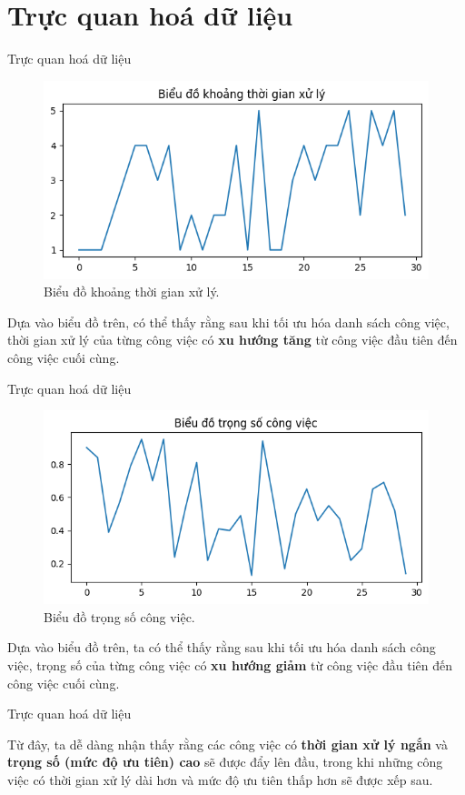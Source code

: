 \documentclass[10pt]{beamer}
\begin{document}
\section*{Trực quan hoá dữ liệu}

\begin{frame}{Trực quan hoá dữ liệu}
\begin{figure}[h]
\centering
\includegraphics[width=0.7\linewidth]{output_p.png}
\caption{Biểu đồ khoảng thời gian xử lý.}
\end{figure}

Dựa vào biểu đồ trên, có thể thấy rằng sau khi tối ưu hóa danh sách công việc, thời gian xử lý của từng công việc có \textbf{xu hướng tăng} từ công việc đầu tiên đến công việc cuối cùng.
\end{frame}

\begin{frame}{Trực quan hoá dữ liệu}
\begin{figure}[h]
\centering
\includegraphics[width=0.7\linewidth]{output_w.png}
\caption{Biểu đồ trọng số công việc.}
\end{figure}

Dựa vào biểu đồ trên, ta có thể thấy rằng sau khi tối ưu hóa danh sách công việc, trọng số của từng công việc có \textbf{xu hướng giảm} từ công việc đầu tiên đến công việc cuối cùng.
\end{frame}

\begin{frame}{Trực quan hoá dữ liệu}

Từ đây, ta dễ dàng nhận thấy rằng các công việc có \textbf{thời gian xử lý ngắn} và \textbf{trọng số (mức độ ưu tiên) cao} sẽ được đẩy lên đầu, trong khi những công việc có thời gian xử lý dài hơn và mức độ ưu tiên thấp hơn sẽ được xếp sau.
\end{frame}
\end{document}
